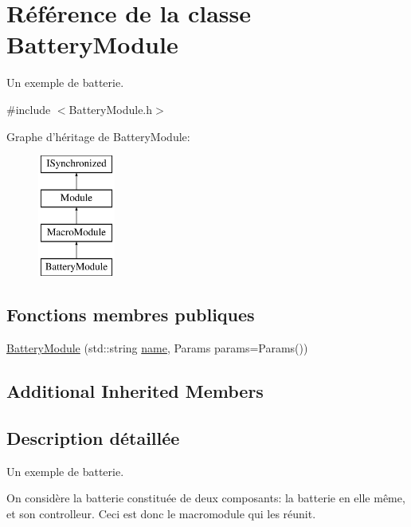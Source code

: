 \hypertarget{classBatteryModule}{\section{Référence de la classe Battery\-Module}
\label{classBatteryModule}
}


Un exemple de batterie.  




{\ttfamily \#include $<$Battery\-Module.\-h$>$}

Graphe d'héritage de Battery\-Module\-:\begin{figure}[H]
\begin{center}
\leavevmode
\includegraphics[height=4.000000cm]{classBatteryModule}
\end{center}
\end{figure}
\subsection*{Fonctions membres publiques}
\begin{DoxyCompactItemize}
\item 
\hyperlink{classBatteryModule_a2fb494ef5f124c38c0fdf9ccfb31918f}{Battery\-Module} (std\-::string \hyperlink{classModule_a794fbb44972c7c73cc197159093e66d1}{name}, Params params=Params())
\end{DoxyCompactItemize}
\subsection*{Additional Inherited Members}


\subsection{Description détaillée}
Un exemple de batterie. 

On considère la batterie constituée de deux composants\-: la batterie en elle même, et son controlleur. Ceci est donc le macromodule qui les réunit. 

